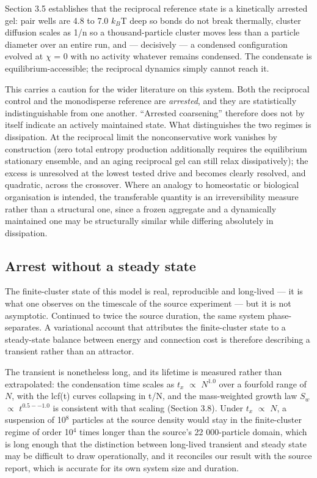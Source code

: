\documentclass[aps,pre,preprint,superscriptaddress,nofootinbib,longbibliography]{revtex4-2}
\begin{document}
Section 3.5 establishes that the reciprocal reference state is a kinetically arrested gel: pair wells are 4.8 to 7.0 $k_B$T deep so bonds do not break thermally, cluster diffusion scales as 1/n so a thousand-particle cluster moves less than a particle diameter over an entire run, and --- decisively --- a condensed configuration evolved at $\chi$ = 0 with no activity whatever remains condensed. The condensate is equilibrium-accessible; the reciprocal dynamics simply cannot reach it.

This carries a caution for the wider literature on this system. Both the reciprocal control and the monodisperse reference are \emph{arrested}, and they are statistically indistinguishable from one another. ``Arrested coarsening'' therefore does not by itself indicate an actively maintained state. What distinguishes the two regimes is dissipation. At the reciprocal limit the nonconservative work vanishes by construction (zero total entropy production additionally requires the equilibrium stationary ensemble, and an aging reciprocal gel can still relax dissipatively); the excess is unresolved at the lowest tested drive and becomes clearly resolved, and quadratic, across the crossover. Where an analogy to homeostatic or biological organisation is intended, the transferable quantity is an irreversibility measure rather than a structural one, since a frozen aggregate and a dynamically maintained one may be structurally similar while differing absolutely in dissipation.

\subsection{Arrest without a steady state}

The finite-cluster state of this model is real, reproducible and long-lived --- it is what one observes on the timescale of the source experiment --- but it is not asymptotic. Continued to twice the source duration, the same system phase-separates. A variational account that attributes the finite-cluster state to a steady-state balance between energy and connection cost is therefore describing a transient rather than an attractor.

The transient is nonetheless long, and its lifetime is measured rather than extrapolated: the condensation time scales as $t_{x}$ $\propto$ $N^{1.0}$ over a fourfold range of $N$, with the lcf(t) curves collapsing in t/N, and the mass-weighted growth law $S_{w}$ $\propto$ $t^{0.5--1.0}$ is consistent with that scaling (Section 3.8). Under $t_{x}$ $\propto$ $N$, a suspension of 10$^{8}$ particles at the source density would stay in the finite-cluster regime of order 10$^{4}$ times longer than the source's 22 000-particle domain, which is long enough that the distinction between long-lived transient and steady state may be difficult to draw operationally, and it reconciles our result with the source report, which is accurate for its own system size and duration.
\end{document}
